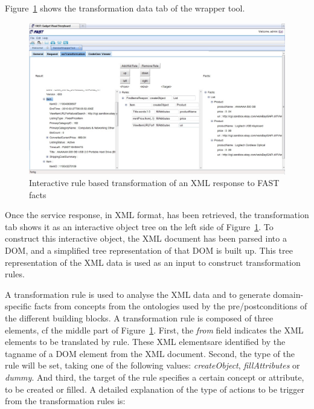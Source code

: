 \documentclass{fast_latex}
\begin{document}
Figure~\ref{fig:response_service_execution} shows the transformation data tab of the wrapper tool. 

\begin{figure}
  \begin{center}
    \includegraphics[angle=90,width=0.8\linewidth]{images/ServiceWrapperToolGVSWithTransformationRules.jpg}
    \caption{Interactive rule based transformation of an XML response to FAST facts}
    \label{fig:response_service_execution}
  \end{center}
\end{figure}

Once the service response, in XML format, has been retrieved, the transformation tab shows it as an interactive object tree on the left side of Figure~\ref{fig:response_service_execution}. To construct this interactive object, the XML document has been parsed into a DOM, and a simplified tree representation of that DOM is built up. This tree representation of the XML data is used as an input to construct transformation rules.

A transformation rule is used to analyse the XML data and to generate domain-specific facts from concepts from the ontologies used by the pre/postconditions of the different building blocks. A transformation rule is composed of three elements, cf the middle part of Figure~\ref{fig:response_service_execution}. First, the \textit{from} field indicates the XML elements to be translated by rule. These XML elementsare identified by the tagname of a DOM element from the XML document. Second, the type of the rule will be set, taking one of the following values: \emph{createObject}, \emph{fillAttributes} or \emph{dummy}. And third, the target of the rule specifies a certain concept or attribute, to be created or filled. A detailed explanation of the type of actions to be trigger from the transformation rules is:
\end{document}
